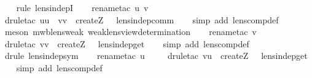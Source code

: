 \begin{isabellebody}
%
\isadelimproof
\ \ %
\endisadelimproof
%
\isatagproof
{}\isamarkupfalse%
\ {\isacharparenleft}rule\ lens{\isacharunderscore}indepI{\isacharparenright}\isanewline
\ \ \isamarkupfalse%
\ {\isacharparenleft}rename{\isacharunderscore}tac\ u\ v\ {\isasymsigma}{\isacharparenright}\isanewline
\ \ \isamarkupfalse%
\ {\isacharparenleft}drule{\isacharunderscore}tac\ u{\isacharequal}u\ \ v{\isacharequal}v\ \ {\isasymsigma}{\isacharequal}{\isachardoublequoteopen}create\isactrlbsub Z\isactrlesub \ {\isasymsigma}{\isachardoublequoteclose}\ \ lens{\isacharunderscore}indep{\isacharunderscore}comm{\isacharparenright}\isanewline
\ \ \isamarkupfalse%
\ {\isacharparenleft}simp\ add{\isacharcolon}\ lens{\isacharunderscore}comp{\isacharunderscore}def{\isacharparenright}\isanewline
\ \ \isamarkupfalse%
\ {\isacharparenleft}meson\ mwb{\isacharunderscore}lens{\isacharunderscore}weak\ weak{\isacharunderscore}lens{\isachardot}view{\isacharunderscore}determination{\isacharparenright}\isanewline
\ \ \isamarkupfalse%
\ {\isacharparenleft}rename{\isacharunderscore}tac\ v\ {\isasymsigma}{\isacharparenright}\isanewline
\ \ \isamarkupfalse%
\ {\isacharparenleft}drule{\isacharunderscore}tac\ v{\isacharequal}v\ \ {\isasymsigma}{\isacharequal}{\isachardoublequoteopen}create\isactrlbsub Z\isactrlesub \ {\isasymsigma}{\isachardoublequoteclose}\ \ lens{\isacharunderscore}indep{\isacharunderscore}get{\isacharparenright}\isanewline
\ \ \isamarkupfalse%
\ {\isacharparenleft}simp\ add{\isacharcolon}\ lens{\isacharunderscore}comp{\isacharunderscore}def{\isacharparenright}\isanewline
\ \ \isamarkupfalse%
\ {\isacharparenleft}drule\ lens{\isacharunderscore}indep{\isacharunderscore}sym{\isacharparenright}\isanewline
\ \ \isamarkupfalse%
\ {\isacharparenleft}rename{\isacharunderscore}tac\ u\ {\isasymsigma}{\isacharparenright}\isanewline
\ \ \isamarkupfalse%
\ {\isacharparenleft}drule{\isacharunderscore}tac\ v{\isacharequal}u\ \ {\isasymsigma}{\isacharequal}{\isachardoublequoteopen}create\isactrlbsub Z\isactrlesub \ {\isasymsigma}{\isachardoublequoteclose}\ \ lens{\isacharunderscore}indep{\isacharunderscore}get{\isacharparenright}\isanewline
\ \ \isamarkupfalse%
\ {\isacharparenleft}simp\ add{\isacharcolon}\ lens{\isacharunderscore}comp{\isacharunderscore}def{\isacharparenright}\isanewline

\end{isabellebody}
